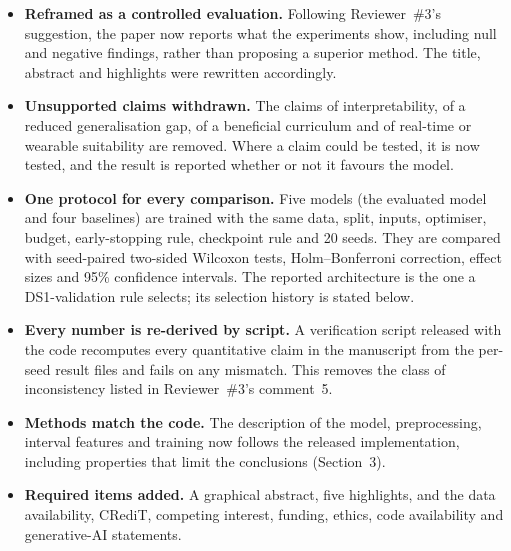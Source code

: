 \documentclass[11pt]{article}
\begin{document}
\begin{itemize}[leftmargin=1.2em,itemsep=2pt]
\item \textbf{Reframed as a controlled evaluation.} Following Reviewer~\#3's suggestion, the paper now reports what the experiments show, including null and negative findings, rather than proposing a superior method. The title, abstract and highlights were rewritten accordingly.
\item \textbf{Unsupported claims withdrawn.} The claims of interpretability, of a reduced generalisation gap, of a beneficial curriculum and of real-time or wearable suitability are removed. Where a claim could be tested, it is now tested, and the result is reported whether or not it favours the model.
\item \textbf{One protocol for every comparison.} Five models (the evaluated model and four baselines) are trained with the same data, split, inputs, optimiser, budget, early-stopping rule, checkpoint rule and 20 seeds. They are compared with seed-paired two-sided Wilcoxon tests, Holm--Bonferroni correction, effect sizes and 95\% confidence intervals. The reported architecture is the one a DS1-validation rule selects; its selection history is stated below.
\item \textbf{Every number is re-derived by script.} A verification script released with the code recomputes every quantitative claim in the manuscript from the per-seed result files and fails on any mismatch. This removes the class of inconsistency listed in Reviewer~\#3's comment~5.
\item \textbf{Methods match the code.} The description of the model, preprocessing, interval features and training now follows the released implementation, including properties that limit the conclusions (Section~3).
\item \textbf{Required items added.} A graphical abstract, five highlights, and the data availability, CRediT, competing interest, funding, ethics, code availability and generative-AI statements.
\end{itemize}
\end{document}
